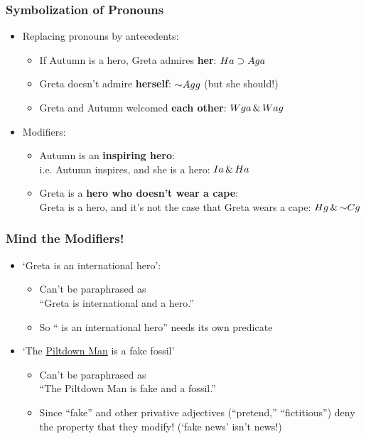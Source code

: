 \begin{frame}
\frametitle{Symbolization of Pronouns}

\begin{itemize}[<+->]
\item Replacing pronouns by antecedents:
\begin{itemize}[<+->]
  \item If Autumn is a hero, Greta admires \textbf{her}: \alert{$Ha \supset Aga$}
  \item Greta doesn't admire \textbf{herself}: \alert{$\enot A\qr{g}{g}$} (but she should!)
  \item Greta and Autumn welcomed \textbf{each other}: \alert{$Wga \,\&\, Wag$}
\end{itemize}

\bigskip

\item Modifiers:
\begin{itemize}[<+->]
  \item Autumn is an \textbf{inspiring hero}:\\
  i.e. Autumn inspires, and she is a hero: \alert{$Ia \,\&\, Ha$}
  \item Greta is a \textbf{hero who doesn't wear a cape}:\\
   Greta is a hero, and it's not the case that Greta wears a cape:
   \alert{$H\qv{g} \eand \enot C\qv{g}$}
\end{itemize}
\end{itemize}
\end{frame}

\begin{frame}
\frametitle{Mind the Modifiers!}

\begin{itemize}[<+->]
\item `Greta is an international hero':
\begin{itemize}
  \item Can't be paraphrased as\\
  ``Greta is international and a hero.''
  \item So ``\gap{} is an international hero'' needs its own
  predicate
\end{itemize}
\item `The \href{https://en.wikipedia.org/wiki/Piltdown_Man}{Piltdown Man} is a fake fossil'
\begin{itemize}[<+->]
  \item Can't be paraphrased as\\
  ``The Piltdown Man is fake and a fossil.''
  \item Since ``fake'' and other privative adjectives (``pretend,''
  ``fictitious'') deny the property that they modify!  (`fake news' isn't news!)
\end{itemize}
\end{itemize}
\end{frame}

